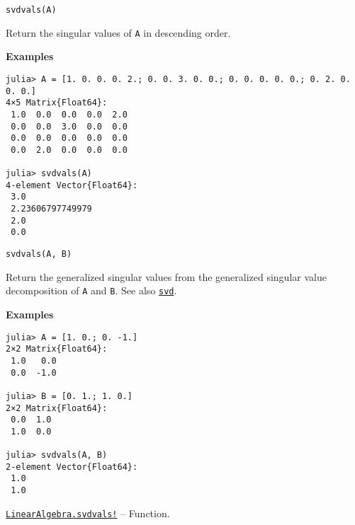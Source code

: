 \begin{adjustwidth}{2em}{0pt}


\begin{verbatim}
svdvals(A)
\end{verbatim}

Return the singular values of \texttt{A} in descending order.

\textbf{Examples}


\begin{verbatim}
julia> A = [1. 0. 0. 0. 2.; 0. 0. 3. 0. 0.; 0. 0. 0. 0. 0.; 0. 2. 0. 0. 0.]
4×5 Matrix{Float64}:
 1.0  0.0  0.0  0.0  2.0
 0.0  0.0  3.0  0.0  0.0
 0.0  0.0  0.0  0.0  0.0
 0.0  2.0  0.0  0.0  0.0

julia> svdvals(A)
4-element Vector{Float64}:
 3.0
 2.23606797749979
 2.0
 0.0
\end{verbatim}




\begin{lstlisting}
svdvals(A, B)
\end{lstlisting}

Return the generalized singular values from the generalized singular value decomposition of \texttt{A} and \texttt{B}. See also \hyperlink{6661056220970412040}{\texttt{svd}}.

\textbf{Examples}


\begin{verbatim}
julia> A = [1. 0.; 0. -1.]
2×2 Matrix{Float64}:
 1.0   0.0
 0.0  -1.0

julia> B = [0. 1.; 1. 0.]
2×2 Matrix{Float64}:
 0.0  1.0
 1.0  0.0

julia> svdvals(A, B)
2-element Vector{Float64}:
 1.0
 1.0
\end{verbatim}



\end{adjustwidth}
\hypertarget{590278903094160607}{}
\hyperlink{590278903094160607}{\texttt{LinearAlgebra.svdvals!}}  -- {Function.}

